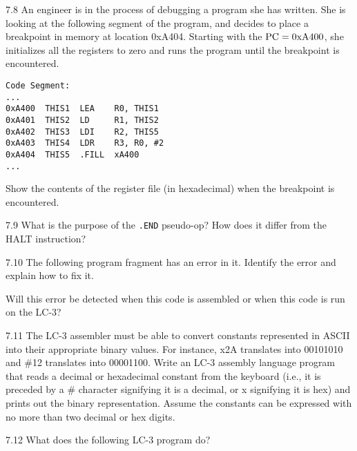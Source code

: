 \documentclass{patt}
\begin{document}
\begin{exercises}
\newpage

\item[7.8] An engineer is in the process of debugging a program she
  has written. She is looking at the following segment of the program,
  and decides to place a breakpoint in memory at location 0xA404.
  Starting with the ${\rm PC}=0{\rm xA}400$, she initializes all the
  registers to zero and runs the program until the breakpoint is
  encountered.

\bigskip

\begin{lstlisting}
Code Segment:
...
0xA400  THIS1  LEA    R0, THIS1
0xA401  THIS2  LD     R1, THIS2
0xA402  THIS3  LDI    R2, THIS5
0xA403  THIS4  LDR    R3, R0, #2
0xA404  THIS5  .FILL  xA400
...
\end{lstlisting}\vspace{10pt}
  Show the contents of the register file (in hexadecimal) when the
  breakpoint is encountered.

\item[7.9] What is the purpose of the {\tt .END} pseudo-op?
  How does it differ from the HALT instruction?

\item[7.10] The following program fragment has an error in it.
  Identify the error and explain how to fix it.
\bigskip
{}
\bigskip\vspace{-3pt}

\noindent
  Will this error be detected when this code is assembled or when this
  code is run on the LC-3?

\item[7.11] The LC-3 assembler must be able to convert constants
  represented in ASCII into their appropriate binary values.  For
  instance, x2A translates into 00101010 and \#12 translates into
  00001100. Write an LC-3 assembly language program that reads a
  decimal or hexadecimal constant from the keyboard (i.e., it is
  preceded by a \# character signifying it is a decimal, or x
  signifying it is hex) and prints out the binary representation.
  Assume the constants can be expressed with no more than two decimal
  or hex digits.

\newpage

\item[7.12] What does the following LC-3 program do?\vspace{10pt}


\end{exercises}
\end{document}
